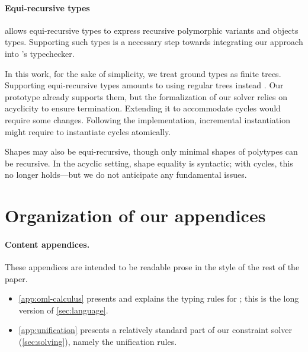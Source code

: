 \documentclass[acmsmall,screen,nonacm,review]{acmart}
\begin{document}
\paragraph{Equi-recursive types}
\label {sec/rec-types}

\OCaml allows equi-recursive types to express recursive polymorphic variants
and objects types. Supporting such types is a necessary step towards integrating
our approach into \OCaml's typechecker.

In this work, for the sake of simplicity, we treat ground types as finite
trees. Supporting equi-recursive types amounts to using regular trees instead
\citep*{Pottier-Remy/emlti}. Our prototype already supports them,
but the formalization of our solver relies on acyclicity to ensure
termination.  Extending it to accommodate cycles would require some changes.
Following the implementation, incremental instantiation
might require to instantiate cycles atomically.

Shapes may also be equi-recursive, though only minimal shapes of polytypes
can be recursive. In the acyclic setting, shape equality is syntactic; with
cycles, this no longer holds---but we do not anticipate any fundamental issues.




\newpage
\appendix

\section*{Organization of our appendices}
\label{app:outline}

\paragraph{Content appendices.} These appendices are intended to be
readable prose in the style of the rest of the paper.

\begin{itemize}
\item \cref{app:oml-calculus} presents and explains the typing rules for \OML;
  this is the long version of \cref{sec:language}.
\item \cref{app:unification} presents a relatively standard part of our constraint solver (\cref{sec:solving}),
  namely the unification rules.
\end{itemize}
\end{document}
